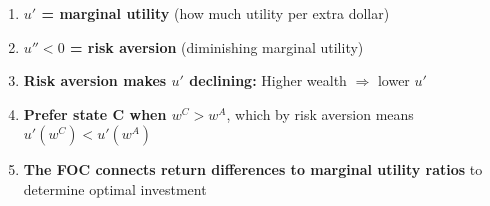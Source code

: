 \documentclass[12pt]{article}
\begin{document}
\begin{enumerate}[leftmargin=2cm, itemsep=1em]
    \item \textbf{$u'$ = marginal utility} (how much utility per extra dollar)

    \item \textbf{$u'' < 0$ = risk aversion} (diminishing marginal utility)

    \item \textbf{Risk aversion makes $u'$ declining:} Higher wealth $\Rightarrow$ lower $u'$

    \item \textbf{Prefer state C when $w^C > w^A$}, which by risk aversion means $u'(w^C) < u'(w^A)$

    \item \textbf{The FOC connects return differences to marginal utility ratios} to determine optimal investment
\end{enumerate}
\end{document}
